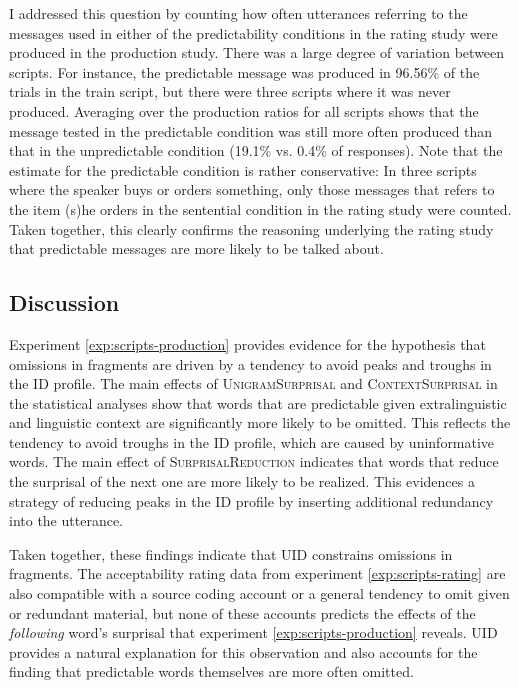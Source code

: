 I addressed this question by counting how often utterances referring to the messages used in either of the predictability conditions in the rating study were produced in the production study. There was a large degree of variation between scripts. For instance, the predictable message was produced in 96.56\% of the trials in the train script, but there were three scripts where it was never produced. Averaging over the production ratios for all scripts shows that the message tested in the predictable condition was still more often produced than that in the unpredictable condition (19.1\% vs. 0.4\% of responses). Note that the estimate for the predictable condition is rather conservative: In three scripts where the speaker buys or orders something, only those messages that refers to the item (s)he orders in the sentential condition in the rating study were counted. Taken together, this clearly confirms the reasoning underlying the rating study that predictable messages are more likely to be talked about.

\subsection{Discussion}

Experiment \ref{exp:scripts-production} provides evidence for the hypothesis that omissions in fragments are driven by a tendency to avoid peaks and troughs in the ID profile. The main effects of \textsc{UnigramSurprisal} and \textsc{ContextSurprisal} in the statistical analyses show that words that are predictable given extralinguistic and linguistic context are significantly more likely to be omitted. This reflects the tendency to avoid troughs in the ID profile, which are caused by uninformative words. The main effect of \textsc{SurprisalReduction} indicates that words that reduce the surprisal of the next one are more likely to be realized. This evidences a strategy of reducing peaks in the ID profile by inserting additional redundancy into the utterance.

Taken together, these findings indicate that UID constrains omissions in fragments. The acceptability rating data from experiment \ref{exp:scripts-rating} are also compatible with a source coding account or a general tendency to omit given or redundant material, but none of these accounts predicts the effects of the \textit{following} word's surprisal that experiment \ref{exp:scripts-production} reveals. UID provides a natural explanation for this observation and also accounts for the finding that predictable words themselves are more often omitted.

